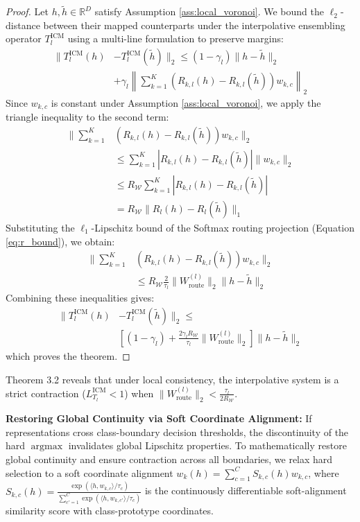\begin{proof}
Let $h, \tilde{h} \in \mathbb{R}^D$ satisfy Assumption \ref{ass:local_voronoi}. We bound the $\ell_2$-distance between their mapped counterparts under the interpolative ensembling operator $T_l^{\text{ICM}}$ using a multi-line formulation to preserve margins:
\begin{align}
\|T_l^{\text{ICM}}(h) & - T_l^{\text{ICM}}(\tilde{h})\|_2 \le (1 - \gamma_l) \|h - \tilde{h}\|_2 \nonumber \\
& + \gamma_l \left\| \sum_{k=1}^K \left( R_{k, l}(h) - R_{k, l}(\tilde{h}) \right) w_{k, c} \right\|_2
\end{align}
Since $w_{k, c}$ is constant under Assumption \ref{ass:local_voronoi}, we apply the triangle inequality to the second term:
\begin{align}
\Big\| \sum_{k=1}^K & \left( R_{k, l}(h) - R_{k, l}(\tilde{h}) \right) w_{k, c} \Big\|_2 \nonumber \\
& \le \sum_{k=1}^K \left| R_{k, l}(h) - R_{k, l}(\tilde{h}) \right| \|w_{k, c}\|_2 \nonumber \\
& \le R_{\mathcal{W}} \sum_{k=1}^K \left| R_{k, l}(h) - R_{k, l}(\tilde{h}) \right| \nonumber \\
& = R_{\mathcal{W}} \|R_l(h) - R_l(\tilde{h})\|_1
\end{align}
Substituting the $\ell_1$-Lipschitz bound of the Softmax routing projection (Equation \ref{eq:r_bound}), we obtain:
\begin{align}
\Big\| \sum_{k=1}^K & \left( R_{k, l}(h) - R_{k, l}(\tilde{h}) \right) w_{k, c} \Big\|_2 \nonumber \\
& \le R_{\mathcal{W}} \frac{2}{\tau_l} \|W_{\text{route}}^{(l)}\|_2 \|h - \tilde{h}\|_2
\end{align}
Combining these inequalities gives:
\begin{align}
\|T_l^{\text{ICM}}(h) & - T_l^{\text{ICM}}(\tilde{h})\|_2 \le \nonumber \\
& \left[ (1 - \gamma_l) + \frac{2 \gamma_l R_{\mathcal{W}}}{\tau_l} \|W_{\text{route}}^{(l)}\|_2 \right] \|h - \tilde{h}\|_2
\end{align}
which proves the theorem.
\end{proof}
Theorem 3.2 reveals that under local consistency, the interpolative system is a strict contraction ($L_{T_l}^{\text{ICM}} < 1$) when $\|W_{\text{route}}^{(l)}\|_2 < \frac{\tau_l}{2 R_{\mathcal{W}}}$. 

\textbf{Restoring Global Continuity via Soft Coordinate Alignment:}
If representations cross class-boundary decision thresholds, the discontinuity of the hard $\operatorname{argmax}$ invalidates global Lipschitz properties. To mathematically restore global continuity and ensure contraction across all boundaries, we relax hard selection to a soft coordinate alignment $w_k(h) = \sum_{c=1}^C S_{k, c}(h) w_{k, c}$, where $S_{k, c}(h) = \frac{\exp\left( \langle h, w_{k, c} \rangle / \tau_c \right)}{\sum_{c'=1}^C \exp\left( \langle h, w_{k, c'} \rangle / \tau_c \right)}$ is the continuously differentiable soft-alignment similarity score with class-prototype coordinates. 

